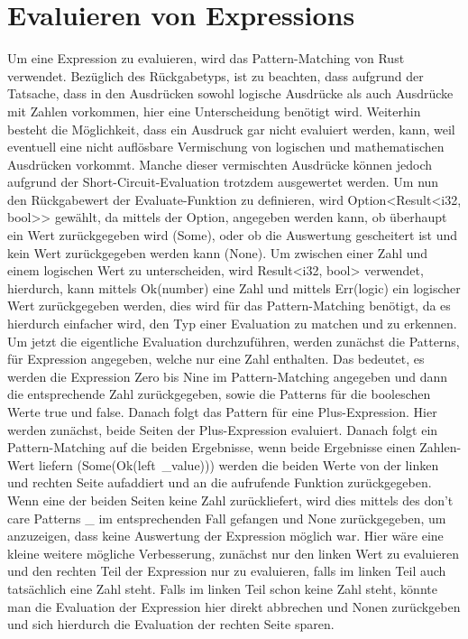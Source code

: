 \documentclass[a4paper, 1ppt]{article}
\begin{document}
\section{Evaluieren von Expressions}
Um eine Expression zu evaluieren, wird das Pattern-Matching von Rust verwendet. Bezüglich des Rückgabetyps, ist zu beachten, dass aufgrund der Tatsache, dass in den Ausdrücken sowohl logische Ausdrücke als auch Ausdrücke mit Zahlen vorkommen, hier eine Unterscheidung benötigt wird. Weiterhin besteht die Möglichkeit, dass ein Ausdruck gar nicht evaluiert werden, kann, weil eventuell eine nicht auflösbare Vermischung von logischen und mathematischen Ausdrücken vorkommt. Manche dieser vermischten Ausdrücke können jedoch aufgrund der Short-Circuit-Evaluation trotzdem ausgewertet werden.
Um nun den Rückgabewert der Evaluate-Funktion zu definieren, wird Option<Result<i32, bool>> gewählt, da mittels der Option, angegeben werden kann, ob überhaupt ein Wert zurückgegeben wird (Some), oder ob die Auswertung gescheitert ist und kein Wert zurückgegeben werden kann (None). Um zwischen einer Zahl und einem logischen Wert zu unterscheiden, wird Result<i32, bool> verwendet, hierdurch, kann mittels Ok(number) eine Zahl und mittels Err(logic) ein logischer Wert zurückgegeben werden, dies wird für das Pattern-Matching benötigt, da es hierdurch einfacher wird, den Typ einer Evaluation zu matchen und zu erkennen.
Um jetzt die eigentliche Evaluation durchzuführen, werden zunächst die Patterns, für Expression angegeben, welche nur eine Zahl enthalten. Das bedeutet, es werden die Expression Zero bis Nine im Pattern-Matching angegeben und dann die entsprechende Zahl zurückgegeben, sowie die Patterns für die booleschen Werte true und false.
Danach folgt das Pattern für eine Plus-Expression. Hier werden zunächst, beide Seiten der Plus-Expression evaluiert. Danach folgt ein Pattern-Matching auf die beiden Ergebnisse, wenn beide Ergebnisse einen Zahlen-Wert liefern (Some(Ok(left\
\_value))) werden die beiden Werte von der linken und rechten Seite aufaddiert und an die aufrufende Funktion zurückgegeben. Wenn eine der beiden Seiten keine Zahl zurückliefert, wird dies mittels des don't care Patterns \_ im entsprechenden Fall gefangen und None zurückgegeben, um anzuzeigen, dass keine Auswertung der Expression möglich war. Hier wäre eine kleine weitere mögliche Verbesserung, zunächst nur den linken Wert zu evaluieren und den rechten Teil der Expression nur zu evaluieren, falls im linken Teil auch tatsächlich eine Zahl steht. Falls im linken Teil schon keine Zahl steht, könnte man die Evaluation der Expression hier direkt abbrechen und Nonen zurückgeben und sich hierdurch die Evaluation der rechten Seite sparen.
\end{document}
